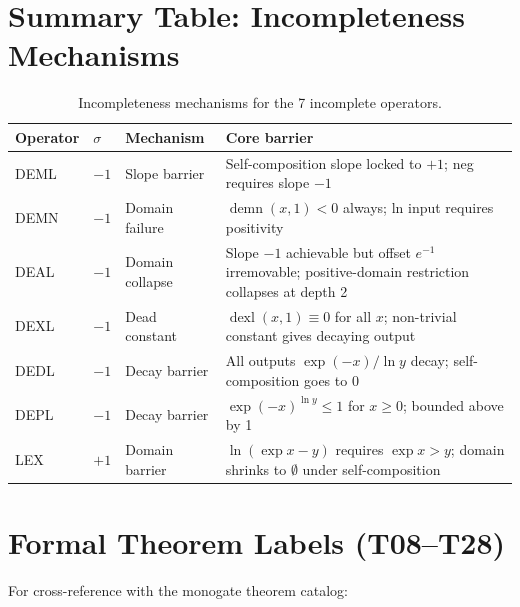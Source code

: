 \documentclass[12pt,a4paper]{article}
\theoremstyle{definition}
\begin{document}
\section{Summary Table: Incompleteness Mechanisms}

\begin{table}[h]
\centering
\caption{Incompleteness mechanisms for the 7 incomplete operators.}
\label{tab:incomplete}
\smallskip
\begin{tabular}{@{}lllp{5.5cm}@{}}
\toprule
\textbf{Operator} & \textbf{$\sigma$} & \textbf{Mechanism} & \textbf{Core barrier} \\
\midrule
DEML & $-1$ & Slope barrier  & Self-composition slope locked to $+1$; neg requires slope $-1$ \\
DEMN & $-1$ & Domain failure & $\operatorname{demn}(x,1)<0$ always; ln input requires positivity \\
DEAL & $-1$ & Domain collapse & Slope $-1$ achievable but offset $e^{-1}$ irremovable; positive-domain restriction collapses at depth 2 \\
DEXL & $-1$ & Dead constant   & $\operatorname{dexl}(x,1)\equiv 0$ for all $x$; non-trivial constant gives decaying output \\
DEDL & $-1$ & Decay barrier  & All outputs $\exp(-x)/\ln y$ decay; self-composition goes to $0$ \\
DEPL & $-1$ & Decay barrier  & $\exp(-x)^{\ln y}\leq 1$ for $x\geq 0$; bounded above by 1 \\
LEX  & $+1$ & Domain barrier & $\ln(\exp x - y)$ requires $\exp x > y$; domain shrinks to $\emptyset$ under self-composition \\
\bottomrule
\end{tabular}
\end{table}

\section{Formal Theorem Labels (T08--T28)}

For cross-reference with the monogate theorem catalog:
\end{document}
